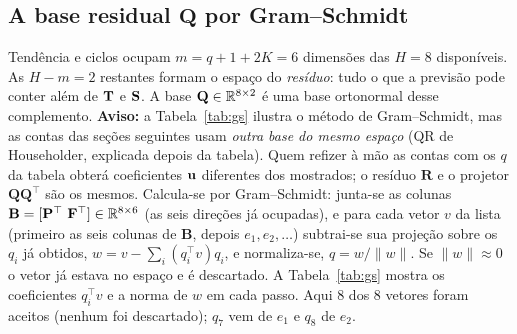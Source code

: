 \documentclass[11pt,a4paper]{article}
\newcommand{\bP}{\mathbf{P}}\newcommand{\bF}{\mathbf{F}}\newcommand{\bFt}{\widetilde{\mathbf{F}}}\newcommand{\bQ}{\mathbf{Q}}
\newcommand{\bR}{\mathbf{R}}\newcommand{\byh}{\hat{\mathbf{y}}}\newcommand{\bX}{\mathbf{X}}
\begin{document}
\subsection{A base residual $\bQ$ por Gram--Schmidt}

Tendência e ciclos ocupam $m=q+1+2K=6$ dimensões das $H=8$ disponíveis. As $H-m=2$ restantes formam o espaço do \emph{resíduo}: tudo o que a previsão pode conter além de $\mathbf{T}$ e $\mathbf{S}$. A base $\bQ\in\R^{8\times2}$ é uma base ortonormal desse complemento. \textbf{Aviso:} a Tabela~\ref{tab:gs} ilustra o método de Gram--Schmidt, mas as contas das seções seguintes usam \emph{outra base do mesmo espaço} (QR de Householder, explicada depois da tabela). Quem refizer à mão as contas com os $q$ da tabela obterá coeficientes $\mathbf{u}$ diferentes dos mostrados; o resíduo $\bR$ e o projetor $\bQ\bQ^\top$ são os mesmos. Calcula-se por Gram--Schmidt: junta-se as colunas $\mathbf B=[\bP^\top\ \bF^\top]\in\R^{8\times6}$ (as seis direções já ocupadas), e para cada vetor $v$ da lista (primeiro as seis colunas de $\mathbf B$, depois $e_1,e_2,\dots$) subtrai-se sua projeção sobre os $q_i$ já obtidos, $w=v-\sum_i(q_i^\top v)q_i$, e normaliza-se, $q=w/\|w\|$. Se $\|w\|\approx0$ o vetor já estava no espaço e é descartado. A Tabela~\ref{tab:gs} mostra os coeficientes $q_i^\top v$ e a norma de $w$ em cada passo. Aqui 8 dos 8 vetores foram aceitos (nenhum foi descartado); $q_7$ vem de $e_1$ e $q_8$ de $e_2$.

\begin{table}[H]
\centering
\caption{Gram--Schmidt passo a passo (3 algarismos significativos). Os primeiros seis vetores são as colunas de $\mathbf B$; os dois últimos completam a base com $e_1$ e $e_2$.}\label{tab:gs}
\scriptsize
{}
\par\vspace{2pt}{\footnotesize Fonte: elaborado pelo autor.}
\end{table}
\end{document}
